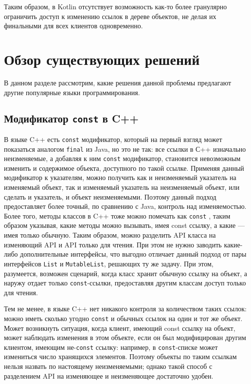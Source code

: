 \documentclass[specification,annotation,times]{itmo-student-thesis}
\begin{document}
Таким образом, в Kotlin отсутствует возможность как-то более гранулярно ограничить доступ к изменению ссылок в дереве объектов, не 
делая их финальными для всех клиентов одновременно.

\section{Обзор существующих решений}
\startrelatedwork

В данном разделе рассмотрим, какие решения данной проблемы предлагают другие популярные языки программирования.

\subsection{Модификатор \texttt{const} в C++}

В языке C++ \cite{iso-cpp} есть \texttt{const} модификатор, который на первый взгляд может показаться аналогом \texttt{final} из Java, но это не так: все ссылки в С++ изначально неизменяемые, а добавляя к ним \texttt{const} модификатор, становится невозможным изменить и содержимое объекта, доступного по такой ссылке.
Применяя данный модификатор к указателям, можно получить как и неизменяемый указатель на изменяемый объект, так и изменяемый указатель на неизменяемый объект, или сделать и указатель, и объект неизменяемыми.
Поэтому данный подход предоставляет более точный, по сравнению с Java, контроль над изменяемостью.
Более того, методы классов в C++ тоже можно помечать как \texttt{const} \cite{cpp-const}, таким образом указывая, какие методы можно вызывать, имея const ссылку, а какие --- имея только обычную.
Таким образом, можно разделить API класса на изменяющий API и API только для чтения. При этом не нужно заводить какие-либо дополнительные интерфейсы, что выгодно отличает данный подход от пары интерфейсов \texttt{List} и \texttt{MutableList}, решающих ту же задачу.
При этом, разумеется, возможен сценарий, когда класс хранит обычную ссылку на объект, а наружу отдает только \texttt{const}-ссылки, предоставляя другим классам доступ только для чтения.

Тем не менее, в языке C++ нет никакого контроля за количеством таких ссылок: можно иметь сколько угодно \texttt{const} и обычных ссылок на один и тот же объект. Может возникнуть ситуация, когда клиент, имеющий const ссылку на объект, может наблюдать изменения в этом объекте, если он был модифицирован другим клиентом, имеющим не-\texttt{const} ссылку: например, в \texttt{const}-списке может измениться число хранящихся элементов.
Поэтому объекты по таким ссылкам нельзя назвать по настоящему неизменяемыми; однако такой способ с разделением API на изменяющее и неизменяющее достаточно удобен.
\end{document}
